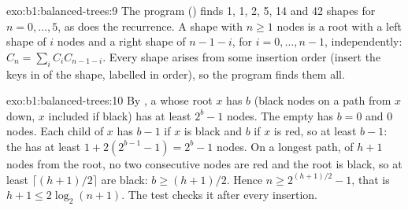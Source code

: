\begin{solution}{exo:b1:balanced-trees:9}
The program () finds 1, 1, 2, 5, 14 and 42 shapes for $n = 0, \dots, 5$, as does the
recurrence. A shape with $n \geq 1$ nodes is a root with a left shape of $i$ nodes and a right shape of $n - 1 - i$, for
$i = 0, \dots, n - 1$, independently: $C_n = \sum_i C_i C_{n-1-i}$. Every shape arises from some insertion order (insert
the keys in  of the shape, labelled in order), so the program finds them all.
\end{solution}

\begin{solution}{exo:b1:balanced-trees:10}
By , a  whose root $x$ has  $b$ (black nodes on a path from $x$ down, $x$
included if black) has at least $2^b - 1$ nodes. The empty  has $b = 0$ and 0 nodes. Each child of $x$ has  $b - 1$ if $x$ is black and $b$ if $x$ is red, so at least $b - 1$: the  has at least $1 + 2(2^{b-1} - 1) = 2^b - 1$ nodes. On a longest path, of $h + 1$ nodes from the root,
no two consecutive nodes are red and the root is black, so at least $\lceil (h + 1)/2 \rceil$ are black: $b \geq (h +
1)/2$. Hence $n \geq 2^{(h + 1)/2} - 1$, that is $h + 1 \leq 2 \log_2 (n + 1)$. The test checks it after every insertion.
\end{solution}

